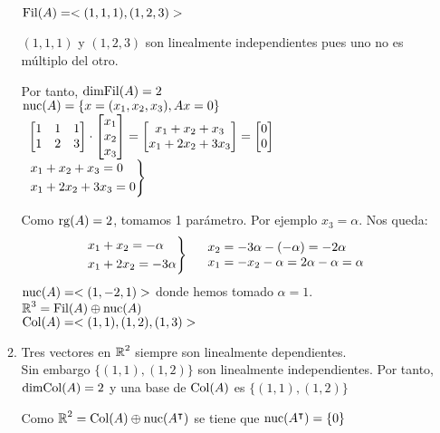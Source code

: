 \begin{enumerate}[label=\color{red}\textbf{\arabic*)}, leftmargin=*]
\begin{enumerate}[label=\color{red}\alph*)]
		$\operatorname{\mathrm{Fil}}(A)=<(1,1,1),(1,2,3)>$
		
		$(1,1,1)$ y $(1,2,3)$ son linealmente independientes pues uno no es múltiplo del otro.
		
		Por tanto, $\operatorname{\mathrm{dimFil}}(A)=2$\\
		$\operatorname{\mathrm{nuc}}(A)=\left\{x=(x_1,x_2,x_3),Ax=0\right\}$\\
		$\begin{array}{l}
		\begin{bmatrix}
		1 & 1 & 1\\
		1 & 2 & 3
		\end{bmatrix}\cdot\begin{bmatrix}
		x_1\\
		x_2\\
		x_3
		\end{bmatrix}=\begin{bmatrix}
		x_1+x_2+x_3\\
		x_1+2x_2+3x_3
		\end{bmatrix}=\begin{bmatrix}
		0\\
		0
		\end{bmatrix}\\
		\begin{rcases}
		x_1+x_2+x_3=0\\
		x_1+2x_2+3x_3=0
		\end{rcases}
		\end{array}$
		
		Como $\operatorname{\mathrm{rg}}(A)=2$, tomamos 1 parámetro. Por ejemplo $x_3=\alpha$. Nos queda:\[ \begin{rcases}
		x_1+x_2=-\alpha\\
		x_1+2x_2=-3\alpha
		\end{rcases}\quad\begin{array}{l}
		x_2=-3\alpha-(-\alpha)=-2\alpha\\
		x_1=-x_2-\alpha=2\alpha-\alpha=\alpha
		\end{array} \]
		$\operatorname{\mathrm{nuc}}(A)=<(1,-2,1)>$ donde hemos tomado $\alpha=1$.\\
		$\operatorname{\mathbb{R}}^3=\operatorname{\mathrm{Fil}}(A)\oplus\operatorname{\mathrm{nuc}}(A)$\\
		$\operatorname{\mathrm{Col}}(A)=<(1,1),(1,2),(1,3)>$\\
		
		\item {}
		
		Tres vectores en $\operatorname{\mathbb{R}}^2$ siempre son linealmente dependientes.\\
				Sin embargo $\{(1,1),(1,2)\}$ son linealmente independientes. Por tanto, $\operatorname{\mathrm{dimCol}}(A)=2$ y una base de $\operatorname{\mathrm{Col}}(A)$ es $\{(1,1),(1,2)\}$
				
				Como $\operatorname{\mathbb{R}}^2=\operatorname{\mathrm{Col}}(A)\oplus\operatorname{\mathrm{nuc}}(A^\intercal)$ se tiene que $\operatorname{\mathrm{nuc}}(A^\intercal)=\{0\}$
	\end{enumerate}
\end{enumerate}
